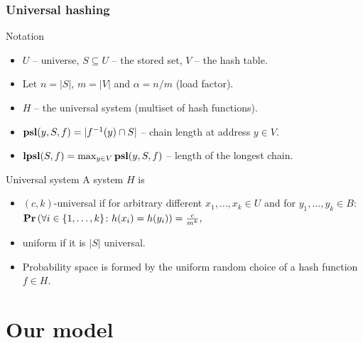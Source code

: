 \begin{frame}
	\frametitle{Universal hashing}
	
	\begin{block}{Notation}
		\begin{itemize}
			\item $U$ -- universe, $S \subseteq U$ -- the stored set, $V$ -- the hash table.
			\item Let $n = |S|$, $m = |V|$ and $\alpha = n / m$ (load factor).
			\item $H$ -- the universal system (multiset of hash functions).
			\item $\mathbf{psl}(y, S, f) = |f^{-1}(y) \cap S|$ -- chain length at address $y \in V$.
			\item $\mathbf{lpsl}(S, f) = \max_{y \in V} \mathbf{psl}(y, S, f)$ -- length of the longest chain.
		\end{itemize}
	\end{block}
	
	\begin{block}{Universal system}
		A system $H$ is
		\begin{itemize}
			\item $(c, k)$-universal if for arbitrary different $x_1, \dots, x_k \in U$ and for $y_1, \dots, y_k \in B$: $\mathbf{Pr}\left(\forall i \in \{1, \dots, k\}\colon h(x_i) = h(y_i)\right) = \frac{c}{m^k},$
			\item uniform if it is $|S|$ universal.
			\item Probability space is formed by the uniform random choice of a hash function $f \in H$.
		\end{itemize}
	\end{block}
\end{frame}

\section{Our model}

